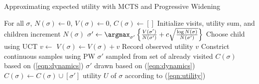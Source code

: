 %

\begin{algorithm}
\caption{Approximating expected utility with MCTS and Progressive Widening}
\label{algo:mcvts}
  \begin{algorithmic}[1]
    \State For all $\sigma$, $N(\sigma) \gets 0$, $V(\sigma) \gets 0$, $C(\sigma) \gets []$
	\Comment Initialize visits, utility sum, and children
    \State increment $N(\sigma)$
    \State $\sigma' \gets \argmax_{\sigma'} \left\{\frac{V(\sigma')}{N(\sigma')} + c \sqrt{\frac{\log N(\sigma)}{N(\sigma')}} \right\}$
      \Comment Choose child using UCT
	  \State $v \gets $
      \State $V(\sigma) \gets V(\sigma) + v$
	  \Comment Record observed utility
      \State \Return $v$
	  \Comment Constrict continuous samples using PW
        \State $\sigma'$ sampled from set of already visited $C(\sigma)$ based on (\ref{eqn:dynamics})
	  \Else
        \State $\sigma'$ drawn based on (\ref{eqn:dynamics})
        \State $C(\sigma) \gets C(\sigma) \cup [\sigma']$
	  \EndIf
      \State \Return {}
    \State \Return utility $U$ of $\sigma$ according to (\ref{eqn:utility})
    \EndIf
    \EndFunction{}
  \end{algorithmic}
\end{algorithm}

